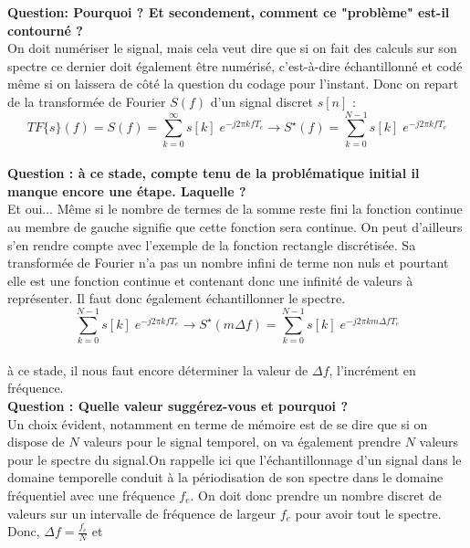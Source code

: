 \documentclass[11pt,a4paper]{article}
\begin{document}
\textbf{Question: Pourquoi ? Et secondement,  comment ce "problème" est-il contourné ?}\\

On doit numériser le signal, mais cela veut dire que si on fait des calculs sur son spectre ce dernier doit également être numérisé, c'est-à-dire échantillonné et codé même si on laissera de côté la question du codage pour l'instant. Donc on repart de la transformée de Fourier $S(f)$ d'un signal discret $s[n]$ :\\

\[ TF\lbrace s \rbrace(f) = S(f) = \sum_{k = 0}^{\infty} s[k] \; e^{-j 2 \pi k f T_e} \rightarrow S^{\star} (f) =  \sum_{k = 0}^{N-1} s[k] \; e^{-j 2 \pi k f T_e} \]\\


\textbf{Question : à ce stade, compte tenu de la problématique initial il manque encore une étape. Laquelle ?}\\

Et oui... Même si le nombre de termes de la somme reste fini la fonction continue au membre de gauche signifie que cette fonction sera continue. On peut d'ailleurs s'en rendre compte avec l'exemple de la fonction rectangle discrétisée. Sa transformée de Fourier n'a pas un nombre infini de terme non nuls et pourtant elle est une fonction continue et contenant donc une infinité de valeurs à représenter. Il faut donc également échantillonner le spectre.\\

\[\sum_{k = 0}^{N-1} s[k] \; e^{-j 2 \pi k f T_e} \rightarrow S^{\star} (m \Delta f) = \sum_{k = 0}^{N-1} s[k] \; e^{-j 2 \pi k m \Delta f T_e} \]\\

à ce stade, il nous faut encore déterminer la valeur de $\Delta f$, l'incrément en fréquence.\\

\textbf{Question : Quelle valeur suggérez-vous et pourquoi ?}\\

Un choix évident, notamment en terme de mémoire est de se dire que si on dispose de $N$ valeurs pour le signal temporel, on va également prendre $N$ valeurs pour le spectre du signal.On rappelle ici que l'échantillonnage d'un signal dans le domaine temporelle conduit à la périodisation de son spectre dans le domaine fréquentiel avec une fréquence $f_e$. On doit donc prendre un nombre discret de valeurs sur un intervalle de fréquence de largeur $f_e$ pour avoir tout le spectre. Donc, $\Delta f = \frac{f_e}{N}$ et\\
\end{document}
